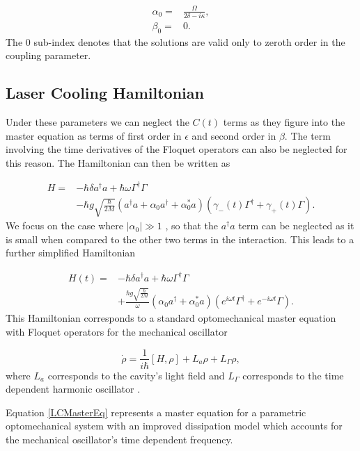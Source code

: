 \documentclass[reprint, amsmath,amssymb, aps,pra]{revtex4-1}
\begin{document}
\begin{align}
\alpha_0 =& \frac{\Omega}{2\delta-i\kappa},\\
\beta_0 =& 0.
\end{align} The 0 sub-index denotes that the solutions are valid only to zeroth order in the coupling parameter. 

\subsection{Laser Cooling Hamiltonian}

Under these parameters we can neglect the $C(t)$ terms as they
figure into the
master equation as terms of first order in $\epsilon$ and second order
in $\beta$. The term involving the time derivatives of the Floquet
operators can also be neglected for this reason. The Hamiltonian can
then be written as

\begin{align}
H =& -\hbar \delta a^{\dagger}a +\hbar\omega\Gamma^{\dagger}\Gamma \\
&-\hbar g\sqrt{\frac{\hbar}{2M}}(a^{\dagger}a +\alpha_0 a^{\dagger}+\alpha^*_0 a)(\gamma_-(t)\Gamma^{\dagger}+\gamma_+(t)\Gamma)\nonumber.
\end{align} We focus on the case where $|\alpha_0| \gg 1$
\cite{BarberisLC}, so that the $a^\dagger a$ term can be neglected as
it is small when compared to the other two terms in the interaction.
This leads to a further simplified Hamiltonian

\begin{align} \label{LCHamiltonian}
H(t) =& -\hbar \delta a^{\dagger}a +\hbar\omega\Gamma^{\dagger}\Gamma \\
&+\frac{\hbar g\sqrt{\frac{\hbar}{2M}}}{\omega}(\alpha_0 a^{\dagger}+\alpha^*_0 a)(e^{i\omega t} \nonumber\Gamma^{\dagger}+e^{-i\omega t}\Gamma).
\end{align}
This Hamiltonian corresponds to a standard optomechanical master
equation with Floquet operators for the mechanical oscillator


\begin{equation}\label{LCMasterEq}
\dot{\rho} = \frac{1}{i\hbar}[H,\rho] +L_a\rho + L_\Gamma \rho,
\end{equation} where $L_a$ corresponds to the cavity's light field \cite{ZollerQN} and $L_\Gamma$ corresponds to the time dependent harmonic oscillator \cite{HanngiFM}.

Equation \eqref{LCMasterEq} represents a master equation for a parametric optomechanical system with an improved dissipation model which accounts for the mechanical oscillator's time dependent frequency.
\end{document}
